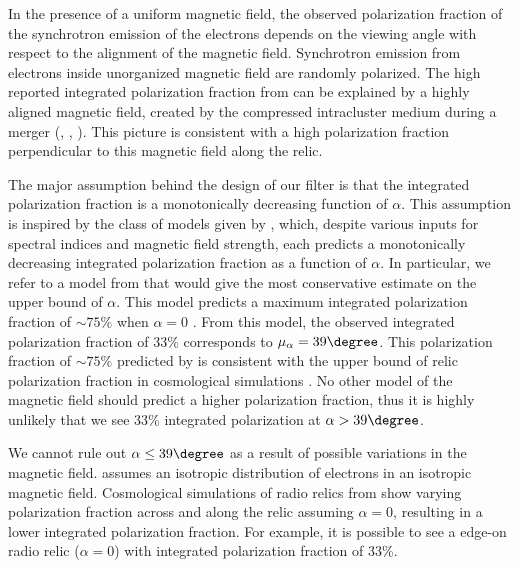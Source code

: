 In the presence of a uniform magnetic field, the observed polarization
fraction of the synchrotron emission of the electrons depends on the
viewing angle with respect to the alignment of the magnetic field. 
Synchrotron emission from electrons inside unorganized magnetic field are
randomly polarized. The high reported integrated polarization fraction from
\citet{L13} can be explained by a highly aligned magnetic field,
created by the compressed intracluster medium during a merger
(\citealt{E98}, \citealt{vanWeeren10}, \citealt{Feretti12}).
This picture is consistent with a high polarization fraction perpendicular
to this magnetic field along the relic. 
\par
The major assumption behind the design of our filter
is that the integrated polarization fraction is a monotonically
decreasing function of $\alpha$. 
This assumption is inspired by the class of models given by \cite{E98}, 
which, despite various inputs for spectral indices and magnetic field strength, each predicts a monotonically decreasing integrated
polarization fraction as a function of $\alpha$. 
In particular, we refer to a model from \cite{E98} that would give the most
conservative estimate on the upper bound of $\alpha$. 
This model predicts a maximum integrated polarization fraction of
$\sim75\%$ when $\alpha = 0$ . From this model, the observed integrated
polarization fraction of 33\% corresponds to $\mu_\alpha =  39\degree$. 
This  polarization fraction of $\sim 75\%$ predicted by \citep{E98} is
consistent with the upper bound of relic polarization fraction in cosmological
simulations \citep{S13}. No other model of the magnetic field should predict a higher polarization fraction, thus it is highly unlikely that we see 33\%
integrated polarization at $\alpha > 39\degree$. \par 

We cannot rule out $\alpha \leq 39\degree$ as a result of possible
variations in the magnetic field. 
\cite{E98} assumes an isotropic distribution of electrons in an isotropic magnetic field. Cosmological
simulations of radio relics from \cite{S13} show varying polarization
fraction across and along the relic assuming $\alpha = 0$, resulting in a
lower integrated polarization fraction. For example, it is possible to see a edge-on radio relic ($\alpha = 0$) with integrated polarization fraction of 33\%. 
\par 

